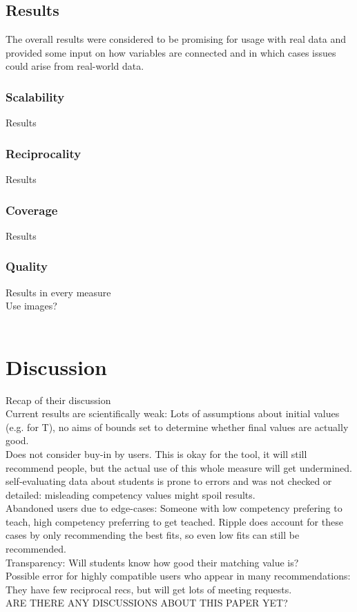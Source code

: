 \documentclass[nochapterpage,bigchapter,linedtoc,longdoc,colorback,accentcolor=tud3b]{tudreport}
\begin{document}
\subsection{Results}
The overall results were considered to be promising for usage with real data and provided some input on how variables are connected and in which cases issues could arise from real-world data.\\
\subsubsection{Scalability}
Results
\subsubsection{Reciprocality}
Results
\subsubsection{Coverage}
Results
\subsubsection{Quality}
Results in every measure\\
Use images?\\\

\section{Discussion}
Recap of their discussion\\
Current results are scientifically weak: Lots of assumptions about initial values (e.g. for T), no aims of bounds set to determine whether final values are actually good.\\
Does not consider buy-in by users. This is okay for the tool, it will still recommend people, but the actual use of this whole measure will get undermined.\\
self-evaluating data about students is prone to errors and was not checked or detailed: misleading competency values might spoil results.\\
Abandoned users due to edge-cases: Someone with low competency prefering to teach, high competency preferring to get teached. Ripple does account for these cases by only recommending the best fits, so even low fits can still be recommended.\\
Transparency: Will students know how good their matching value is?\\
Possible error for highly compatible users who appear in many recommendations: They have few reciprocal recs, but will get lots of meeting requests.\\
ARE THERE ANY DISCUSSIONS ABOUT THIS PAPER YET?\\
\end{document}
